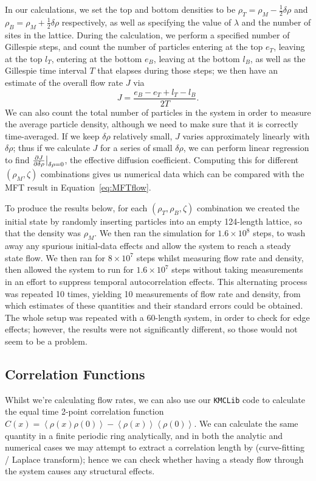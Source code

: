 In our calculations, we set the top and bottom densities to be $\rho_T = \rho_M - \frac{1}{2} \delta\rho$ and $\rho_B = \rho_M + \frac{1}{2} \delta\rho$ respectively, as well as specifying the value of $\lambda$ and the number of sites
in the lattice. During the calculation, we perform a specified number
of Gillespie steps, and count the number of particles entering at the top $e_T$, leaving at the top $l_T$, entering at the bottom $e_B$, leaving at the bottom $l_B$, as well as the Gillespie time interval $T$ that elapses during
those steps; we then have an estimate of the overall flow rate $J$ via
\begin{equation}
 J = \frac{e_B-e_T+l_T-l_B}{2T}.
\end{equation}
We can also count the total number of particles in the system in order to measure the average particle density, although we need to make sure that it is correctly time-averaged.
If we keep $\delta\rho$ relatively small, $J$ varies approximately linearly with $\delta\rho$; thus if we calculate $J$ for a series of small $\delta \rho$, we can perform linear regression to find $\frac{\partial J}{\partial \delta\rho}\big|_{\delta\rho=0}$,
the effective diffusion coefficient. Computing this for different $(\rho_M, \zeta)$ combinations gives us numerical data which can be compared with the MFT result in Equation~\ref{eq:MFTflow}.

To produce the results below, for each $(\rho_T, \rho_B, \zeta)$ combination we created the initial state by randomly inserting particles into an empty 124-length lattice, so that the density was $\rho_M$. We then ran the simulation for
$1.6\times10^8$ steps, to wash away any spurious initial-data effects and allow the system to reach a steady state flow. We then ran for $8\times10^7$ steps whilst measuring flow rate and density, then allowed the system to run for $1.6\times10^7$
steps without taking measurements in an effort to suppress temporal autocorrelation effects. This alternating process was repeated 10 times, yielding 10 measurements of flow rate and density, from which estimates of these quantities and their
standard errors could be obtained. The whole setup was repeated with a 60-length system, in order to check for edge effects; however, the results were not significantly different, so those would not seem to be a problem.

\subsection{Correlation Functions}
Whilst we're calculating flow rates, we can also use our \texttt{KMCLib} code to calculate the equal time 2-point correlation function
$C(x) = \left\langle \rho(x)\rho(0) \right\rangle - \left\langle \rho(x) \right\rangle \left\langle \rho(0) \right\rangle $.
We can calculate the same quantity in a finite periodic ring analytically, and in both the analytic and numerical cases we may attempt to extract a correlation length by (curve-fitting / Laplace transform);
hence we can check whether having a steady flow through the system causes any structural effects.